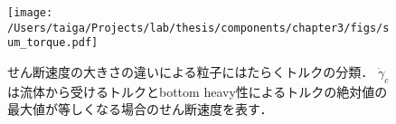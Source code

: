 \begin{figure}[H]
    \centering
    \texttt{[image: /Users/taiga/Projects/lab/thesis/components/chapter3/figs/sum\_torque.pdf]}
    \caption{せん断速度の大きさの違いによる粒子にはたらくトルクの分類．
    $\dot{\gamma}_c$は流体から受けるトルクとbottom heavy性によるトルクの絶対値の最大値が等しくなる場合のせん断速度を表す．}
    \label{fig:sum_torque}
\end{figure}
